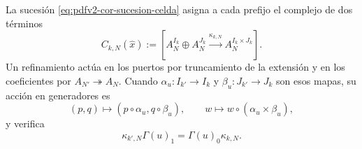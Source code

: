 La sucesión \eqref{eq:pdfv2-cor-sucesion-celda} asigna a cada prefijo el
complejo de dos términos
\begin{equation}
\label{eq:pdfv2-cor-cono-celda}
 C_{k,N}(\widehat x):=
 \left[A_N^{I_k}\oplus A_N^{J_k}
 \xrightarrow{\kappa_{k,N}}A_N^{I_k\times J_k}\right].
\end{equation}
Un refinamiento actúa en los puertos por truncamiento de la extensión y en
los coeficientes por \(A_{N'}\twoheadrightarrow A_N\). Cuando
\(\alpha_u:I_{k'}\to I_k\) y \(\beta_u:J_{k'}\to J_k\) son esos mapas, su
acción en generadores es
\begin{equation}
\label{eq:pdfv2-cor-refinamiento-celda}
 (p,q)\longmapsto(p\circ\alpha_u,q\circ\beta_u),
 \qquad
 w\longmapsto w\circ(\alpha_u\times\beta_u),
\end{equation}
y verifica
\begin{equation}
\label{eq:pdfv2-cor-refinamiento-cadena}
 \kappa_{k',N}\Gamma(u)_1=\Gamma(u)_0\kappa_{k,N}.
\end{equation}

